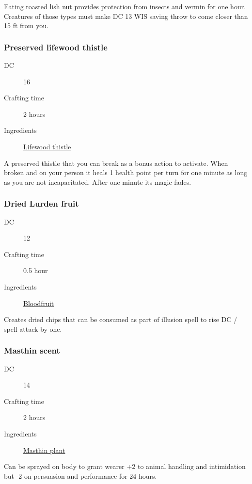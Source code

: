 Eating roasted lish nut provides protection from insects and vermin for one hour. 
Creatures of those types must make DC 13 WIS saving throw to come closer than 15 ft from you.

\subsubsection{Preserved lifewood thistle}
\label{Preserved lifewood thistle}

\begin{description}
\item [DC] 16
\item [Crafting time] 2 hours
\item [Ingredients] \hyperref[Lifewood]{Lifewood thistle}
\end{description}

A preserved thistle that you can break as a bonus action to activate. 
When broken and on your person it heals 1 health point per turn for one minute 
as long as you are not incapacitated. After one minute its magic fades.

\subsubsection{Dried Lurden fruit}
\label{Dried Lurden fruit}

\begin{description}
\item [DC] 12
\item [Crafting time] 0.5 hour
\item [Ingredients] \hyperref[Luurden]{Bloodfruit}
\end{description}

Creates dried chips that can be consumed as part of illusion spell to rise DC / spell attack by one.

\subsubsection{Masthin scent}
\label{Masthin scent}

\begin{description}
\item [DC] 14
\item [Crafting time] 2 hours
\item [Ingredients] \hyperref[Masthin]{Masthin plant}
\end{description}

Can be sprayed on body to grant wearer +2 to animal handling and intimidation 
but -2 on persuasion and performance for 24 hours.

